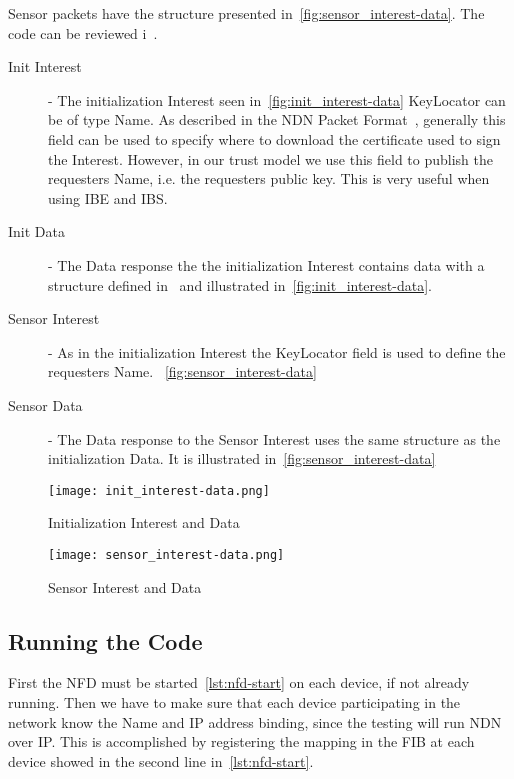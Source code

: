 Sensor packets have the structure presented in~\autoref{fig:sensor_interest-data}.
The code can be reviewed i~\cite[messageBuf.proto]{garseg15}.
\begin{description}
	\item[Init Interest] - 
  The initialization Interest seen in~\autoref{fig:init_interest-data}
  KeyLocator can be of type Name. 
  As described in the \gls{NDN} Packet Format~\cite{ndnpacketformat}, generally this field can be used to specify where to download the certificate used to sign the Interest.
  However, in our trust model we use this field to publish the requesters Name, i.e. the requesters public key. 
  This is very useful when using \gls{IBE} and \gls{IBS}.
	\item[Init Data] - 
  The Data response the the initialization Interest contains data with a structure defined in~\cite[messageBuf.proto]{garseg15} and illustrated in~\autoref{fig:init_interest-data}.
	\item[Sensor Interest] -
	As in the initialization Interest the KeyLocator field is used to define the requesters Name. ~\autoref{fig:sensor_interest-data}
	\item[Sensor Data] - 
  The Data response to the Sensor Interest uses the same structure as the initialization Data. It is illustrated in~\autoref{fig:sensor_interest-data}
\end{description}

\begin{figure}[ht]
  \centering
  \texttt{[image: init\_interest-data.png]}
  \caption{Initialization Interest and Data}
  \label{fig:init_interest-data}
\end{figure}

\begin{figure}[ht]
  \centering
  \texttt{[image: sensor\_interest-data.png]}
  \caption{Sensor Interest and Data}
  \label{fig:sensor_interest-data}
\end{figure}

\subsection{Running the Code}
First the \gls{NFD} must be started~\autoref{lst:nfd-start} on each device, if not already running. 
Then we have to make sure that each device participating in the network know the Name and \gls{IP} address binding, since the testing will run \gls{NDN} over \gls{IP}.
This is accomplished by registering the mapping in the \gls{FIB} at each device showed in the second line in~\autoref{lst:nfd-start}.

